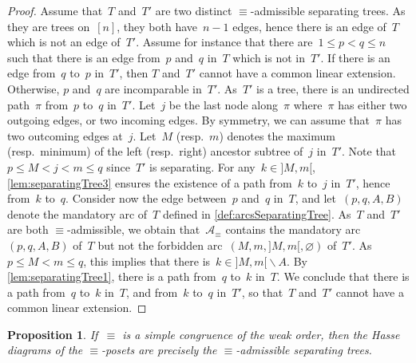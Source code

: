 \documentclass{amsart}
\newtheorem{proposition}[theorem]{Proposition}
\theoremstyle{definition}
\newcommand{\ssm}{\smallsetminus} %
\newcommand{\arcs}{{\mathcal{A}}} %
\begin{document}
\begin{proof}
Assume that~$T$ and~$T'$ are two distinct $\equiv$-admissible separating trees. 
As they are trees on~$[n]$, they both have~$n-1$ edges, hence there is an edge of~$T$ which is not an edge of~$T'$.
Assume for instance that there are~$1 \le p < q \le n$ such that there is an edge from~$p$ and~$q$ in~$T$ which is not in~$T'$.
If there is an edge from~$q$ to~$p$ in~$T'$, then $T$ and~$T'$ cannot have a common linear extension.
Otherwise, $p$ and~$q$ are incomparable in~$T'$.
As~$T'$ is a tree, there is an undirected path~$\pi$ from~$p$ to~$q$ in~$T'$.
Let~$j$ be the last node along~$\pi$ where~$\pi$ has either two outgoing edges, or two incoming edges.
By symmetry, we can assume that~$\pi$ has two outcoming edges at~$j$.
Let~$M$ (resp.~$m$) denotes the maximum (resp.~minimum) of the left (resp.~right) ancestor subtree of~$j$ in~$T'$.
Note that~$p \le M < j < m \le q$ since~$T'$ is separating.
For any~$k \in {]M,m[}$, \cref{lem:separatingTree3} ensures the existence of a path from~$k$ to~$j$ in~$T'$, hence from~$k$ to~$q$.
Consider now the edge between~$p$ and~$q$ in~$T$, and let~$(p, q, A, B)$ denote the mandatory arc of~$T$ defined in \cref{def:arcsSeparatingTree}.
As~$T$ and~$T'$ are both $\equiv$-admissible, we obtain that~$\arcs_\equiv$ contains the mandatory arc~$(p, q, A, B)$ of~$T$ but not the forbidden arc~$(M, m, {]M,m[}, \varnothing)$ of~$T'$.
As~$p \le M < m \le q$, this implies that there is~$k \in {]M,m[} \ssm A$.
By \cref{lem:separatingTree1}, there is a path from~$q$ to~$k$ in~$T$.
We conclude that there is a path from~$q$ to~$k$ in~$T$, and from~$k$ to~$q$ in~$T'$, so that~$T$ and~$T'$ cannot have a common linear extension.
\end{proof}

\begin{proposition}
\label{prop:admissibleSeparatingTrees}
If~$\equiv$ is a simple congruence of the weak order, then the Hasse diagrams of the $\equiv$-posets are precisely the $\equiv$-admissible separating trees.
\end{proposition}
\end{document}
